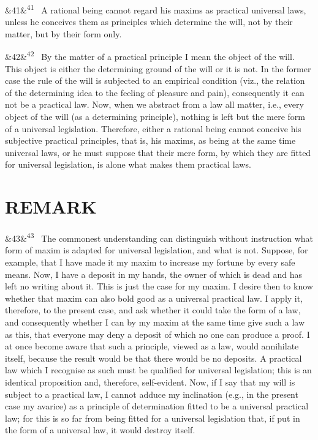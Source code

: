 \documentclass[12pt]{article}
\newcommand{\para}[1][]{\par\noindent\ifx&#1&\else\textsuperscript{\footnotesize #1}~\fi}
\begin{document}
\para[41] A rational being cannot regard his maxims as practical universal laws, unless he conceives them as principles which determine the will, not by their matter, but by their form only.

\para[42] By the matter of a practical principle I mean the object of the will. This object is either the determining ground of the will or it is not. In the former case the rule of the will is subjected to an empirical condition (viz., the relation of the determining idea to the feeling of pleasure and pain), consequently it can not be a practical law. Now, when we abstract from a law all matter, i.e., every object of the will (as a determining principle), nothing is left but the mere form of a universal legislation. Therefore, either a rational being cannot conceive his subjective practical principles, that is, his maxims, as being at the same time universal laws, or he must suppose that their mere form, by which they are fitted for universal legislation, is alone what makes them practical laws.

\section*{REMARK}

\para[43] The commonest understanding can distinguish without instruction what form of maxim is adapted for universal legislation, and what is not. Suppose, for example, that I have made it my maxim to increase my fortune by every safe means. Now, I have a deposit in my hands, the owner of which is dead and has left no writing about it. This is just the case for my maxim. I desire then to know whether that maxim can also bold good as a universal practical law. I apply it, therefore, to the present case, and ask whether it could take the form of a law, and consequently whether I can by my maxim at the same time give such a law as this, that everyone may deny a deposit of which no one can produce a proof. I at once become aware that such a principle, viewed as a law, would annihilate itself, because the result would be that there would be no deposits. A practical law which I recognise as such must be qualified for universal legislation; this is an identical proposition and, therefore, self-evident. Now, if I say that my will is subject to a practical law, I cannot adduce my inclination (e.g., in the present case my avarice) as a principle of determination fitted to be a universal practical law; for this is so far from being fitted for a universal legislation that, if put in the form of a universal law, it would destroy itself.
\end{document}
